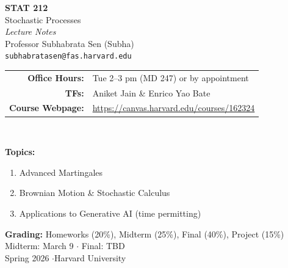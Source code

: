 \begin{titlepage}
    \centering
    \vspace*{2cm}

    {\Huge\bfseries STAT 212\\[0.3cm]}
    {\Large Stochastic Processes}\\[1.5cm]

    {\large\itshape Lecture Notes}\\[2cm]

    {\large Professor Subhabrata Sen (Subha)}\\[0.3cm]
    {\normalsize \texttt{subhabratasen@fas.harvard.edu}}\\[1cm]

    {\normalsize
    \begin{tabular}{rl}
        \textbf{Office Hours:} & Tue 2--3 pm (MD 247) or by appointment \\
        \textbf{TFs:} & Aniket Jain \& Enrico Yao Bate \\
        \textbf{Course Webpage:} & \url{https://canvas.harvard.edu/courses/162324}
    \end{tabular}
    }\\[1.5cm]

    {\normalsize
    \textbf{Topics:}\\[0.3cm]
    \begin{enumerate}[label=(\roman*)]
        \item Advanced Martingales
        \item Brownian Motion \& Stochastic Calculus
        \item Applications to Generative AI (time permitting)
    \end{enumerate}
    }\vspace{1cm}

    {\normalsize
    \textbf{Grading:} Homeworks (20\%), Midterm (25\%), Final (40\%), Project (15\%)
    }\\[0.5cm]

    {\normalsize
    Midterm: March 9 \quad $\cdot$ \quad Final: TBD
    }\\[2cm]

    {\small Spring 2026 \quad$\cdot$\quad Harvard University}

    \vfill
\end{titlepage}
